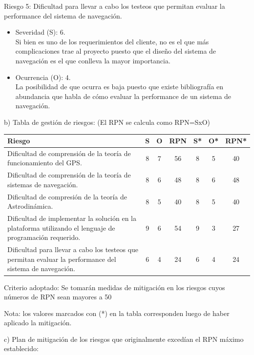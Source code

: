 \documentclass[11pt]{charter}
\begin{document}
Riesgo 5: Dificultad para llevar a cabo los testeos que permitan evaluar la performance del sistema de navegación.
\begin{itemize}
\item Severidad (S): 6. \\
Si bien es uno de los requerimientos del cliente, no es el que más complicaciones trae al proyecto puesto que el diseño del sistema de navegación es el que conlleva la mayor importancia.
\item Ocurrencia (O): 4. \\
La posibilidad de que ocurra es baja puesto que existe bibliografía en abundancia que habla de cómo evaluar la performance de un sistema de navegación.
\end{itemize}

b) Tabla de gestión de riesgos:      (El RPN se calcula como RPN=SxO)

\begin{table}[H]
\centering
\begin{tabularx}{\linewidth}{@{}|X|c|c|c|c|c|c|@{}}
\hline
\rowcolor[HTML]{C0C0C0} 
Riesgo & S & O & RPN & S* & O* & RPN* \\ \hline
Dificultad de comprensión de la teoría de funcionamiento del GPS.       										& 8 & 7 & 56  & 8  & 5  & 40   \\ \hline
Dificultad de comprensión de la teoría de sistemas de navegación.       										& 8 & 6 & 48  & 8  & 6  & 48   \\ \hline
Dificultad de compresión de la teoría de Astrodinámica.       												& 8 & 5 & 40  & 8  & 5  & 40   \\ \hline
Dificultad de implementar la solución en la plataforma utilizando el lenguaje de programación requerido.	& 9 & 6 & 54  & 9  & 3  & 27	\\ \hline
Dificultad para llevar a cabo los testeos que permitan evaluar la performance del sistema de navegación.    & 6 & 4 & 24  & 6  & 4  & 24	\\ \hline
\end{tabularx}%
\end{table}

Criterio adoptado: 
Se tomarán medidas de mitigación en los riesgos cuyos números de RPN sean mayores a 50

Nota: los valores marcados con (*) en la tabla corresponden luego de haber aplicado la mitigación.

c) Plan de mitigación de los riesgos que originalmente excedían el RPN máximo establecido:
 
\end{document}
